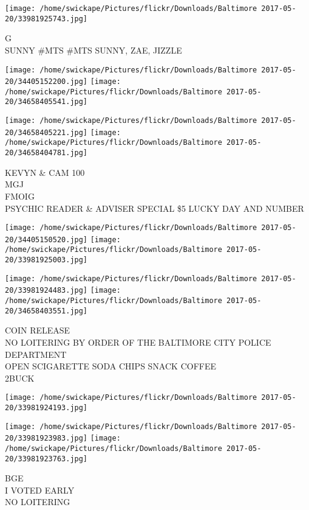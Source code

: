 \documentclass[10pt,letterpaper]{article}
\begin{document}
\vspace{0.25in}
\texttt{[image: /home/swickape/Pictures/flickr/Downloads/Baltimore 2017-05-20/33981925743.jpg]}

G\\
SUNNY \#MTS \#MTS SUNNY, ZAE, JIZZLE\\
\pagebreak

\texttt{[image: /home/swickape/Pictures/flickr/Downloads/Baltimore 2017-05-20/34405152200.jpg]}
\texttt{[image: /home/swickape/Pictures/flickr/Downloads/Baltimore 2017-05-20/34658405541.jpg]}

\texttt{[image: /home/swickape/Pictures/flickr/Downloads/Baltimore 2017-05-20/34658405221.jpg]}
\texttt{[image: /home/swickape/Pictures/flickr/Downloads/Baltimore 2017-05-20/34658404781.jpg]}

KEVYN \& CAM 100\\
MGJ\\
FMOIG\\
PSYCHIC READER \& ADVISER SPECIAL \$5 LUCKY DAY AND NUMBER\\
\pagebreak

\texttt{[image: /home/swickape/Pictures/flickr/Downloads/Baltimore 2017-05-20/34405150520.jpg]}
\texttt{[image: /home/swickape/Pictures/flickr/Downloads/Baltimore 2017-05-20/33981925003.jpg]}

\texttt{[image: /home/swickape/Pictures/flickr/Downloads/Baltimore 2017-05-20/33981924483.jpg]}
\texttt{[image: /home/swickape/Pictures/flickr/Downloads/Baltimore 2017-05-20/34658403551.jpg]}

COIN RELEASE\\
NO LOITERING BY ORDER OF THE BALTIMORE CITY POLICE DEPARTMENT\\
OPEN SCIGARETTE SODA CHIPS SNACK COFFEE\\
2BUCK\\
\pagebreak

\texttt{[image: /home/swickape/Pictures/flickr/Downloads/Baltimore 2017-05-20/33981924193.jpg]}

\vspace{0.25in}
\texttt{[image: /home/swickape/Pictures/flickr/Downloads/Baltimore 2017-05-20/33981923983.jpg]}
\texttt{[image: /home/swickape/Pictures/flickr/Downloads/Baltimore 2017-05-20/33981923763.jpg]}

BGE\\
I VOTED EARLY\\
NO LOITERING\\
\pagebreak
\end{document}
